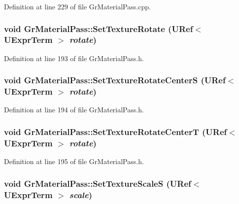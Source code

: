 Definition at line 229 of file GrMaterialPass.cpp.\hypertarget{class_gr_material_pass_a9ad26db402f4f8e52caf3feb36b4749}{
\subsubsection[{SetTextureRotate}]{\setlength{\rightskip}{0pt plus 5cm}void GrMaterialPass::SetTextureRotate ({\bf URef}$<$ {\bf UExprTerm} $>$ {\em rotate})}}
\label{class_gr_material_pass_a9ad26db402f4f8e52caf3feb36b4749}




Definition at line 193 of file GrMaterialPass.h.\hypertarget{class_gr_material_pass_6132f67504d434010d20fefee1a1a512}{
\subsubsection[{SetTextureRotateCenterS}]{\setlength{\rightskip}{0pt plus 5cm}void GrMaterialPass::SetTextureRotateCenterS ({\bf URef}$<$ {\bf UExprTerm} $>$ {\em rotate})}}
\label{class_gr_material_pass_6132f67504d434010d20fefee1a1a512}




Definition at line 194 of file GrMaterialPass.h.\hypertarget{class_gr_material_pass_8f15d8d892cf78090d9a214d13f4ba83}{
\subsubsection[{SetTextureRotateCenterT}]{\setlength{\rightskip}{0pt plus 5cm}void GrMaterialPass::SetTextureRotateCenterT ({\bf URef}$<$ {\bf UExprTerm} $>$ {\em rotate})}}
\label{class_gr_material_pass_8f15d8d892cf78090d9a214d13f4ba83}




Definition at line 195 of file GrMaterialPass.h.\hypertarget{class_gr_material_pass_a1a69dfaf67a8d54d6874e345398fda4}{
\subsubsection[{SetTextureScaleS}]{\setlength{\rightskip}{0pt plus 5cm}void GrMaterialPass::SetTextureScaleS ({\bf URef}$<$ {\bf UExprTerm} $>$ {\em scale})}}
\label{class_gr_material_pass_a1a69dfaf67a8d54d6874e345398fda4}




